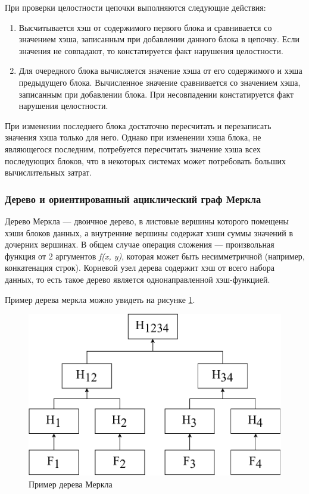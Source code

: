При проверки целостности цепочки выполняются следующие действия:
\begin{enumerate}
    \item Высчитывается хэш от содержимого первого блока и сравнивается со значением хэша, записанным при добавлении данного блока в цепочку. Если значения не совпадают, то констатируется факт нарушения целостности.
    \item Для очередного блока вычисляется значение хэша от его содержимого и хэша предыдущего блока. Вычисленное значение сравнивается со значением хэша, записанным при добавлении блока. При несовпадении констатируется факт нарушения целостности.
\end{enumerate}

При изменении последнего блока достаточно пересчитать и перезаписать значения хэша только для него. Однако при изменении хэша блока, не являющегося последним, потребуется пересчитать значение хэша всех последующих блоков, что в некоторых системах может потребовать больших вычислительных затрат.

\subsubsection{Дерево и ориентированный ациклический граф Меркла}

Дерево Меркла \cite{merkle} --- двоичное дерево, в листовые вершины которого помещены хэши блоков данных, а внутренние вершины содержат хэши суммы значений в дочерних вершинах. В общем случае операция сложения --- произвольная функция от 2 аргументов \textit{f(x, y)}, которая может быть несимметричной (например, конкатенация строк). Корневой узел дерева содержит хэш от всего набора данных, то есть такое дерево является однонаправленной хэш-функцией.

Пример дерева меркла можно увидеть на рисунке \ref{fig:mtree}.

\begin{figure}[hbtp]
    \centering
    \includegraphics[width=\textwidth]{img/merkletree.pdf}
    \caption{Пример дерева Меркла}
    \label{fig:mtree}
\end{figure}

